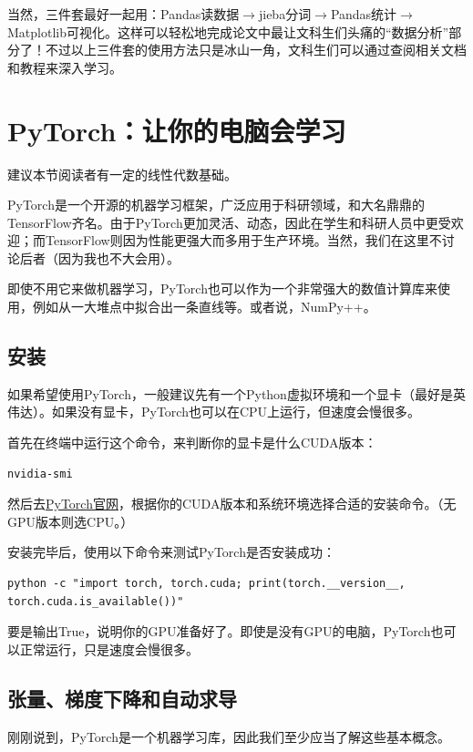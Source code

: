 当然，三件套最好一起用：Pandas读数据$\rightarrow$jieba分词$ \rightarrow $Pandas统计$
\rightarrow
$Matplotlib可视化。这样可以轻松地完成论文中最让文科生们头痛的“数据分析”部分了！不过以上三件套的使用方法只是冰山一角，文科生们可以通过查阅相关文档和教程来深入学习。

\section{PyTorch：让你的电脑会学习}\label{sec:pytorch}
\begin{flushright}
建议本节阅读者有一定的线性代数基础。
\end{flushright}

PyTorch是一个开源的机器学习框架，广泛应用于科研领域，和大名鼎鼎的TensorFlow齐名。由于PyTorch更加灵活、动态，因此在学生和科研人员中更受欢迎；而TensorFlow则因为性能更强大而多用于生产环境。当然，我们在这里不讨论后者（因为我也不大会用）。

即使不用它来做机器学习，PyTorch也可以作为一个非常强大的数值计算库来使用，例如从一大堆点中拟合出一条直线等。或者说，NumPy++。

\subsection{安装}

如果希望使用PyTorch，一般建议先有一个Python虚拟环境和一个显卡（最好是英伟达）。如果没有显卡，PyTorch也可以在CPU上运行，但速度会慢很多。

首先在终端中运行这个命令，来判断你的显卡是什么CUDA版本：
\begin{verbatim}
nvidia-smi
\end{verbatim}

然后去\href{https://pytorch.org/get-started/locally/}{PyTorch官网}，根据你的CUDA版本和系统环境选择合适的安装命令。（无GPU版本则选CPU。）

安装完毕后，使用以下命令来测试PyTorch是否安装成功：
\begin{verbatim}
python -c "import torch, torch.cuda; print(torch.__version__, torch.cuda.is_available())"
\end{verbatim}
要是输出True，说明你的GPU准备好了。即使是没有GPU的电脑，PyTorch也可以正常运行，只是速度会慢很多。

\subsection{张量、梯度下降和自动求导}

刚刚说到，PyTorch是一个机器学习库，因此我们至少应当了解这些基本概念。

